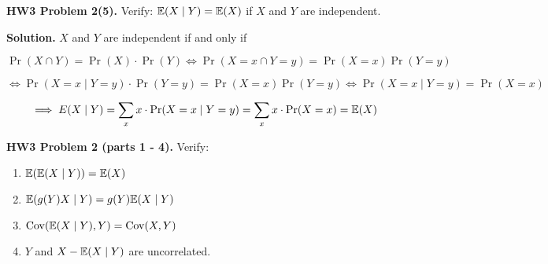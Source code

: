 \textbf{HW3 Problem 2(5).} Verify: \(\E(X \mid Y) = \E(X)\) if \(X\) and \(Y\) are independent.

\textbf{Solution.} \(X\) and \(Y\) are independent if and only if

\[
\Pr(X \cap Y) = \Pr(X)\cdot\Pr(Y) \iff \Pr(X = x \cap Y = y) = \Pr(X = x) \Pr(Y = y)
\]

\[
\iff \Pr(X = x \mid Y = y) \cdot \Pr(Y = y) =  \Pr(X = x) \Pr(Y = y) \iff \Pr(X = x \mid Y = y) = \Pr(X = x)
\]

\[
\implies E(X \mid Y) = \sum_x x \cdot \Pr(X = x \mid Y = y ) = \sum_x x \cdot \Pr(X = x ) = \E(X)
\]


\textbf{HW3 Problem 2 (parts 1 - 4).} Verify:

\begin{enumerate}[(1)]

\item \(\E(\E(X\mid Y)) = \E(X)\)

\item \( \E(g(Y) X \mid Y) = g(Y) \E(X \mid Y) \)

\item \(\Cov ( \E(X \mid Y), Y ) = \Cov(X , Y)\)

\item \(Y\) and \(X - \E(X \mid Y)\) are uncorrelated.

\end{enumerate}

